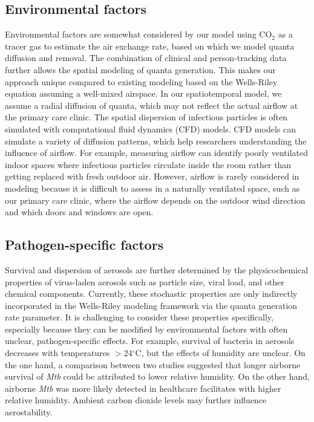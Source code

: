 \documentclass[fleqn,11pt]{wlscirep_supp}
\begin{document}
\subsection{Environmental factors}

Environmental factors are somewhat considered by our model using CO$_2$ as a tracer gas to estimate the air exchange rate, based on which we model quanta diffusion and removal. The combination of clinical and person-tracking data further allows the spatial modeling of quanta generation. This makes our approach unique compared to existing modeling based on the Wells-Riley equation assuming a well-mixed airspace\cite{Riley1961Book,Rudnick2003IndoorAir}. In our spatiotemporal model, we assume a radial diffusion of quanta, which may not reflect the actual airflow at the primary care clinic. The spatial dispersion of infectious particles is often simulated with computational fluid dynamics (CFD) models\cite{Vuorinen2020SafSci,Jung2021InfectChemo,Li2021BuildEnv}. CFD models can simulate a variety of diffusion patterns, which help researchers understanding the influence of airflow. For example, measuring airflow can identify poorly ventilated indoor spaces where infectious particles circulate inside the room rather than getting replaced with fresh outdoor air\cite{Li2021BuildEnv}. However, airflow is rarely considered in modeling because it is difficult to assess in a naturally ventilated space, such as our primary care clinic, where the airflow depends on the outdoor wind direction and which doors and windows are open. 

\subsection{Pathogen-specific factors}

Survival and dispersion of aerosols are further determined by the physicochemical properties of virus-laden aerosols such as particle size, viral load, and other chemical components\cite{Wang2021Science}. Currently, these stochastic properties are only indirectly incorporated in the Wells-Riley modeling framework via the quanta generation rate parameter\cite{Riley1961Book,Rudnick2003IndoorAir}. It is challenging to consider these properties specifically, especially because they can be modified by environmental factors with often unclear, pathogen-specific effects\cite{Songer1967,Chan2011AdvVir,Fernstrom2013JoP,Cox1995Book,Fernstrom2013JoP,Tang2009Interface}. For example, survival of bacteria in aerosols decreases with temperatures $>$24$^{\circ}$C, but the effects of humidity are unclear\cite{Tang2009Interface}. On the one hand, a comparison between two studies suggested that longer airborne survival of \emph{Mtb} could be attributed to lower relative humidity\cite{Loudon1969AMRRD,Lever2000LettersAppliedMicrobio}. On the other hand, airborne \emph{Mtb} was more likely detected in healthcare facilitates with higher relative humidity\cite{Sornboot2019IJTLD,Matuka2021IJERP}. Ambient carbon dioxide levels may further influence aerostability\cite{Haddrell2024NatCommun}.    
\end{document}
